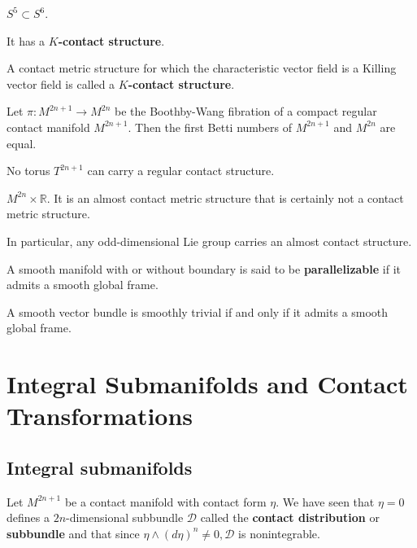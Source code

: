 \begin{example}
    $S^5\subset S^6$.
\end{example}

\begin{example}
   It has a \textbf{$K$-contact structure}.
\end{example}

\begin{definition}
    A contact metric structure for which the characteristic vector field is a Killing vector field is called a \textbf{$K$-contact structure}.
\end{definition}

\begin{theorem}
    Let $\pi: M^{2n+1}\to M^{2n}$ be the Boothby-Wang fibration of a compact regular contact manifold $M^{2n+1}$. Then the first Betti numbers of  $M^{2n+1}$ and $M^{2n}$ are equal.
\end{theorem}
\begin{theorem}
    No torus $T^{2n+1}$ can carry a regular contact structure.
\end{theorem}

\begin{example}
    $M^{2n}\times \mathbb{R}$. It is an almost contact metric structure that is certainly not a contact metric structure.
\end{example}

\begin{example}
In particular, any odd-dimensional Lie group carries an almost contact structure.
\end{example}
\begin{definition}
    A smooth manifold with or without boundary is said to be \textbf{parallelizable} if it admits a smooth global frame.
\end{definition}
\begin{theorem}
    A smooth vector bundle is smoothly trivial if and only if it admits a smooth global frame.
\end{theorem}


\section{Integral Submanifolds and Contact Transformations}

\subsection{Integral submanifolds}
Let $M^{2 n+1}$ be a contact manifold with contact form $\eta$. We have seen that $\eta=0$ defines a $2 n$-dimensional subbundle $\mathcal{D}$ called the \textbf{contact distribution} or\textbf{ subbundle} and that since $\eta \wedge(d \eta)^n \neq 0, \mathcal{D}$ is nonintegrable.

